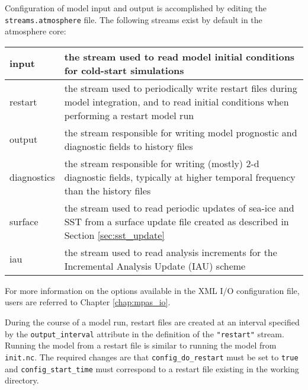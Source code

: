 Configuration of model input and output is accomplished by editing the {\tt streams.atmosphere} file. The following streams exist by default in the atmosphere
core:

\begin{longtable}{|p{1.25in} |p{5.0in}|}
\hline
   input        & the stream used to read model initial conditions for cold-start simulations \\ \hline
   restart      & the stream used to periodically write restart files during model integration, and to read initial conditions when performing a restart model run \\ \hline
   output      & the stream responsible for writing model prognostic and diagnostic fields to history files \\ \hline
   diagnostics & the stream responsible for writing (mostly) 2-d diagnostic fields, typically at higher temporal frequency than the history files \\ \hline
   surface    & the stream used to read periodic updates of sea-ice and SST from a surface update file created as described in Section 
\ref{sec:sst_update} \\ \hline
   iau          & the stream used to read analysis increments for the Incremental Analysis Update (IAU) scheme \\ \hline
\end{longtable}

\noindent For more information on the options available in the XML I/O configuration file, users are referred to Chapter \ref{chap:mpas_io}.

During the course of a model run, restart files are created at an interval specified by the {\tt output\_interval} attribute in the definition of the {\tt "restart"} stream. Running the model from a restart file is similar to running the model from {\tt init.nc}.  The required changes are that {\tt config\_do\_restart} must be set to {\tt true} and {\tt config\_start\_time} must correspond to a restart file existing in the working directory.

